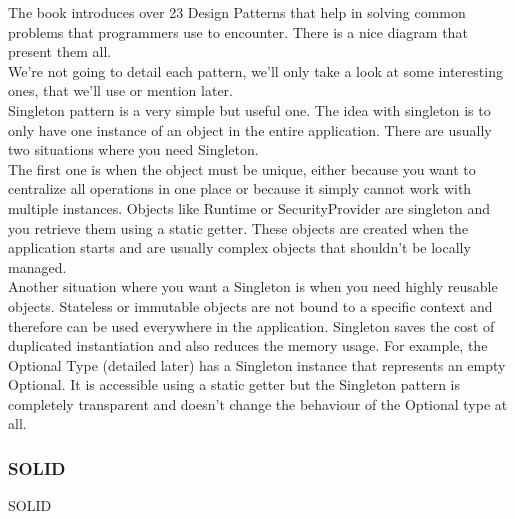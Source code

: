 The book introduces over 23 Design Patterns that help in solving common
problems that programmers use to encounter.
There is a nice diagram that present them all.
\\
\newline
We're not going to detail each pattern, we'll only take a look at some
interesting ones, that we'll use or mention later.\\
\newline
Singleton pattern is a very simple but useful one.
The idea with singleton is to only have one instance of an object in the
entire application.
There are usually two situations where you need Singleton. \\
\newline
The first one is when the object must be unique, either because you want
to centralize all operations in one place or because it simply cannot
work with multiple instances.
Objects like Runtime or SecurityProvider are singleton and you retrieve
them using a static getter.
These objects are created when the application starts and are usually
complex objects that shouldn't be locally managed. \\
\newline
Another situation where you want a Singleton is when you need highly
reusable objects.
Stateless or immutable objects are not bound to a specific context and
therefore can be used everywhere in the application.
Singleton saves the cost of duplicated instantiation and also reduces the
memory usage.
For example, the Optional Type (detailed later) has a Singleton instance
that represents an empty Optional.
It is accessible using a static getter but the Singleton pattern is
completely transparent and doesn't change the behaviour of the Optional
type at all.

\subsubsection{SOLID}
SOLID

